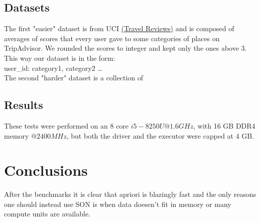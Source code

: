 \documentclass[a4paper]{article}
\begin{document}
	\subsection{Datasets}
	The first "easier" dataset is from UCI \href{https://archive.ics.uci.edu/ml/datasets/Travel+Reviews#}{(Travel Reviews)} and is composed of averages of scores that every user gave to some
	categories of places on TripAdvisor. We rounded the scores to integer and kept only the ones above 3.\\
	This way our dataset is in the form:\\
	user\_id: category1, category2 \ldots\\

	The second "harder" dataset is a collection of 

	\subsection{Results}
	These tests were performed on an 8 core $i5-8250U @1.6GHz$, with 16 GB DDR4 memory $@2400MHz$, but both the driver and the executor were capped at 4 GB.
	
	
	\section{Conclusions}
	After the benchmarks it is clear that apriori is blazingly fast and the only reasons one should instead use SON is when data doesen't fit in memory or many compute units are available.
	
\end{document}
